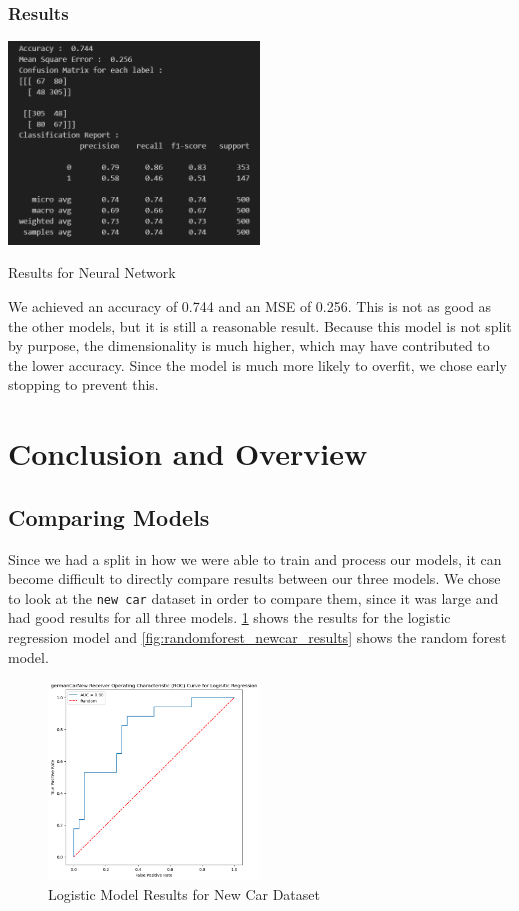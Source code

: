 \documentclass[12pt,twocolumn]{article}
\begin{document}
\subsubsection{Results}
\figure[htbp]
    \centering
    \includegraphics[width=0.5\textwidth]{images/nn_results.png}
    \caption{Results for Neural Network}\label{fig:nn_results}
\endfigure
We achieved an accuracy of 0.744 and an MSE of 0.256. This is not as good as the other models, but it is still a reasonable result. Because this model is not split by purpose, the dimensionality is much higher, which may have contributed to the lower accuracy. Since the model is much more likely to overfit, we chose early stopping to prevent this. 

\section{Conclusion and Overview}
\subsection{Comparing Models}
Since we had a split in how we were able to train and process our models, it can become difficult to directly compare results between our three models. We chose to look at the \texttt{new car} dataset in order to compare them, since it was large and had good results for all three models. \ref{fig:logistic_newcar_results} shows the results for the logistic regression model and \ref{fig:randomforest_newcar_results} shows the random forest model.
\begin{figure}
    \centering
    \includegraphics[width=0.5\textwidth]{images/logistic_newcar.png}
    \caption{Logistic Model Results for New Car Dataset}\label{fig:logistic_newcar_results}
\end{figure}
\end{document}
